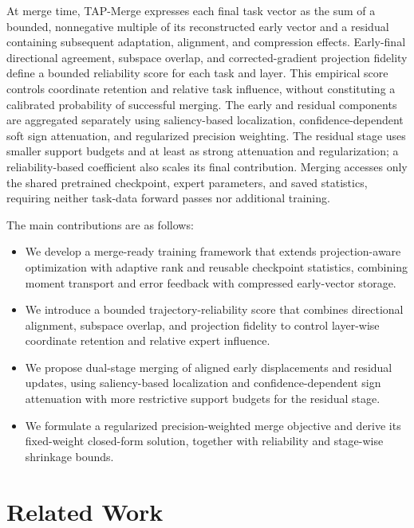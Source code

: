 \documentclass[fleqn,10pt]{wlscirep}
\begin{document}
At merge time, TAP-Merge expresses each final task vector as the sum of
a bounded, nonnegative multiple of its reconstructed early vector and
a residual containing subsequent adaptation, alignment, and compression
effects. Early-final directional agreement, subspace overlap, and
corrected-gradient projection fidelity define a bounded reliability
score for each task and layer. This empirical score controls
coordinate retention and relative task influence, without
constituting a calibrated probability of successful merging. The
early and residual components are aggregated separately using
saliency-based localization, confidence-dependent soft sign
attenuation, and regularized precision weighting. The residual stage
uses smaller support budgets and at least as strong attenuation and
regularization; a reliability-based coefficient also scales its final
contribution. Merging accesses only the shared pretrained checkpoint,
expert parameters, and saved statistics, requiring neither task-data
forward passes nor additional training.

The main contributions are as follows:
\begin{itemize}

\item We develop a merge-ready training framework that extends
projection-aware optimization with adaptive rank and reusable
checkpoint statistics, combining moment transport and error feedback
with compressed early-vector storage.

\item We introduce a bounded trajectory-reliability score that combines
directional alignment, subspace overlap, and projection fidelity to
control layer-wise coordinate retention and relative expert influence.

\item We propose dual-stage merging of aligned early displacements and
residual updates, using saliency-based localization and
confidence-dependent sign attenuation with more restrictive support
budgets for the residual stage.

\item We formulate a regularized precision-weighted merge objective
and derive its fixed-weight closed-form solution, together with
reliability and stage-wise shrinkage bounds.

\end{itemize}




\section{Related Work}
\label{sec:related_work}
\end{document}
